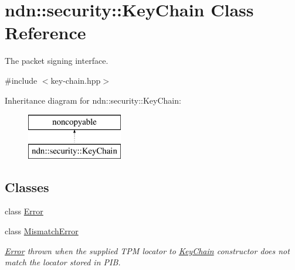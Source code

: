 \hypertarget{classndn_1_1security_1_1KeyChain}{}\section{ndn\+:\+:security\+:\+:Key\+Chain Class Reference}
\label{classndn_1_1security_1_1KeyChain}


The packet signing interface.  




{\ttfamily \#include $<$key-\/chain.\+hpp$>$}

Inheritance diagram for ndn\+:\+:security\+:\+:Key\+Chain\+:\begin{figure}[H]
\begin{center}
\leavevmode
\includegraphics[height=2.000000cm]{classndn_1_1security_1_1KeyChain}
\end{center}
\end{figure}
\subsection*{Classes}
\begin{DoxyCompactItemize}
\item 
class \hyperlink{classndn_1_1security_1_1KeyChain_1_1Error}{Error}
\item 
class \hyperlink{classndn_1_1security_1_1KeyChain_1_1MismatchError}{Mismatch\+Error}
\begin{DoxyCompactList}\small\item\em \hyperlink{classndn_1_1security_1_1KeyChain_1_1Error}{Error} thrown when the supplied T\+PM locator to \hyperlink{classndn_1_1security_1_1KeyChain}{Key\+Chain} constructor does not match the locator stored in P\+IB. \end{DoxyCompactList}\end{DoxyCompactItemize}
